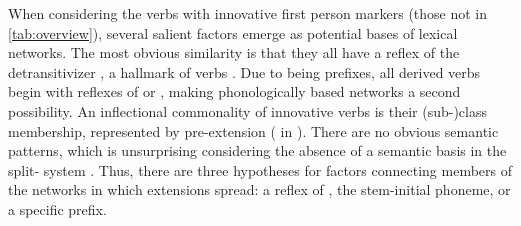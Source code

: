 When considering the  verbs with innovative first person markers (those not in \cref{tab:overview}), several salient factors emerge as potential bases of lexical networks.
The most obvious similarity is that they all have a reflex of the detransitivizer \detrz{} , a hallmark of  verbs .
Due to \detrz{} being prefixes, all derived  verbs begin with reflexes of  or  , making phonologically based networks a second possibility.
An inflectional commonality of innovative verbs is their  (sub-)class membership, represented by pre-extension   ( in \akuriyo).
There are no obvious semantic patterns, which is unsurprising considering the absence of a semantic basis in the split- system .
Thus, there are three hypotheses for factors connecting members of the networks in which extensions spread: a reflex of \detrz, the stem-initial phoneme, or a specific  prefix.

